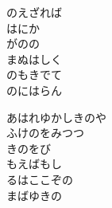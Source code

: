 \documentclass[10pt,b5j]{tarticle} %
\begin{document}
\begin{enumerate}
\begin{minipage}[c]{\blocksize}
        \vspace{\linespace}
        \item
        のえざれば\\
        はにか\\
        がのの\\
        まぬはしく\\
        のもきでて\\
        のにはらん
        
        \vspace{\linespace}
        \item
        あはれゆかしきのや\\
        ふけのをみつつ\\
        きのをび\\
        もえばもし\\
        るはここぞの\\
        まばゆきの
    
    \end{minipage}
\end{enumerate} %
\end{document}
